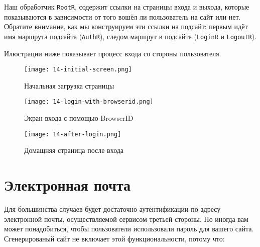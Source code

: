 Наш обработчик \lstinline'RootR', содержит ссылки на страницы входа и выхода, которые показываются в зависимости от того вошёл ли пользователь на сайт или нет. Обратите внимание, как мы конструируем эти ссылки на подсайт: первым идёт имя маршрута подсайта (\lstinline'AuthR'), следом маршрут в подсайте (\lstinline'LoginR' и \lstinline'LogoutR').

Илюстрации ниже показывает процесс входа со стороны пользователя.

\begin{figure}[h!]
  \centering
  \texttt{[image: 14-initial-screen.png]}
  \caption{Начальная загрузка страницы}
\end{figure}

\begin{figure}[h!]
  \centering
  \texttt{[image: 14-login-with-browserid.png]}
  \caption{Экран входа с помощью BrowserID}
\end{figure}

\begin{figure}[h!]
  \centering
  \texttt{[image: 14-after-login.png]}
  \caption{Домащняя страница после входа}
\end{figure}

\section{Электронная почта}

Для большинства случаев будет достаточно аутентификации по адресу электронной почты, осуществляемой сервисом третьей стороны. Но иногда вам может понадобиться, чтобы пользователи использовали пароль для вашего сайта. Сгенерированый сайт не включает этой функциональности, потому что:


